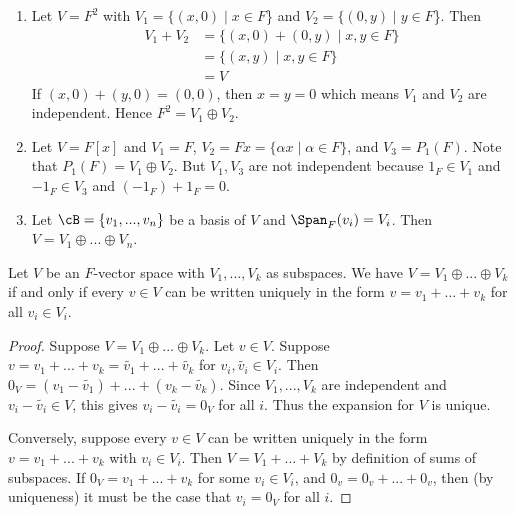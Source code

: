     \begin{example}
        \phantom{a}
        \begin{enumerate}[label = (\arabic*)]
            \item Let $V = F^2$ with $V_1 = \{(x,0) \mid x \in F$\} and $V_2 = \{(0,y) \mid y \in F$\}. Then
                \begin{equation*}
                \begin{split}
                    V_1 + V_2 &= \{(x,0) + (0,y) \mid x,y \in F\} \\
                    &= \{(x,y) \mid x,y \in F\} \\
                    & = V
                \end{split}
                \end{equation*}
            If $(x,0) + (y,0) = (0,0)$, then $x=y=0$ which means $V_1$ and $V_2$ are independent. Hence $F^2 = V_1 \oplus V_2$.

            \item Let $V = F[x]$ and $V_1 = F$, $V_2 = Fx = \{\alpha x \mid \alpha \in F \}$, and $V_3 = P_1(F)$. Note that $P_1(F) = V_1 \oplus V_2$. But $V_1,V_3$ are not independent because $1_F \in V_1$ and $-1_F \in V_3$ and $(-1_F) + 1_F = 0$.
            \item Let $\cB = \{v_1,...,v_n\}$ be a basis of $V$ and $\Span_F{(v_i)} = V_i$. Then $V = V_1 \oplus ... \oplus V_n$.
        \end{enumerate}
    \end{example}

    \begin{lemma}
        Let $V$ be an $F$-vector space with $V_1,...,V_k$ as subspaces. We have $V = V_1 \oplus ... \oplus V_k$ if and only if every $v \in V$ can be written uniquely in the form $v = v_1 + ... + v_k$ for all $v_i \in V_i$.
    \end{lemma}
        \begin{proof}
            Suppose $V = V_1 \oplus ... \oplus V_k$. Let $v \in V$. Suppose $v = v_1 + ... + v_k = \tilde{v_1} + ... + \tilde{v_k}$ for $v_i,\tilde{v_i} \in V_i$. Then $0_V = (v_1 - \tilde{v_1}) + ... + (v_k  - \tilde{v_k})$. Since $V_1,...,V_k$ are independent and $v_i - \tilde{v_i} \in V$, this gives $v_i - \tilde{v_i} = 0_V$ for all $i$. Thus the expansion for $V$ is unique.

            Conversely, suppose every $v \in V$ can be written uniquely in the form $v = v_1 + ... + v_k$ with $v_i \in V_i$. Then $V = V_1 + ... + V_k$ by definition of sums of subspaces. If $0_V = v_1 + ... + v_k$ for some $v_i \in V_i$, and $0_v = 0_v + ... + 0_v$, then (by uniqueness) it must be the case that $v_i = 0_V$ for all $i$.
        \end{proof}

